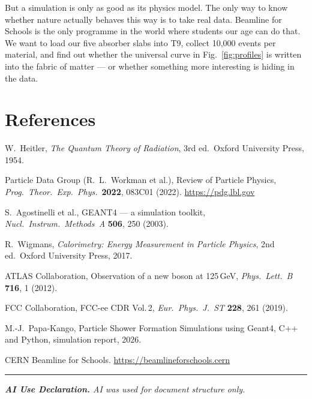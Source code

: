 \documentclass[11pt,a4paper]{article}
\begin{document}
But a simulation is only as good as its physics model.  The only way to
know whether nature actually behaves this way is to take real data.
Beamline for Schools is the only programme in the world where students our
age can do that.  We want to load our five absorber slabs into T9, collect
10,000 events per material, and find out whether the universal curve in
Fig.~\ref{fig:profiles} is written into the fabric of matter --- or whether
something more interesting is hiding in the data.

\section*{References}
\begin{enumerate}[leftmargin=2.2em, label={[\arabic*]},
                  itemsep=3pt, labelsep=6pt]
  \small
  \item W.~Heitler, \textit{The Quantum Theory of Radiation}, 3rd ed.\
        Oxford University Press, 1954.
  \item Particle Data Group (R.~L.~Workman et al.), Review of Particle
        Physics, \textit{Prog.\ Theor.\ Exp.\ Phys.}\ \textbf{2022},
        083C01 (2022). \url{https://pdg.lbl.gov}
  \item S.~Agostinelli et al., GEANT4 --- a simulation toolkit,
        \textit{Nucl.\ Instrum.\ Methods~A} \textbf{506}, 250 (2003).
  \item R.~Wigmans, \textit{Calorimetry: Energy Measurement in Particle
        Physics}, 2nd ed.\ Oxford University Press, 2017.
  \item ATLAS Collaboration, Observation of a new boson at 125\,GeV,
        \textit{Phys.\ Lett.\ B} \textbf{716}, 1 (2012).
  \item FCC Collaboration, FCC-ee CDR Vol.\,2,
        \textit{Eur.\ Phys.\ J.\ ST} \textbf{228}, 261 (2019).
  \item M.-J.~Papa-Kango, Particle Shower Formation Simulations using
        Geant4, C++ and Python, simulation report, 2026.
  \item CERN Beamline for Schools.
        \url{https://beamlineforschools.cern}
\end{enumerate}

\vspace{12pt}
{\color{cernblue}\rule{\linewidth}{1pt}}
\vspace{4pt}

\noindent\small\itshape\color{gray}
\textbf{AI Use Declaration.}
AI was used for document structure only.
\end{document}

